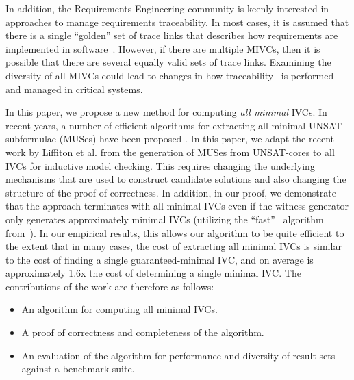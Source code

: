 \noindent In addition, the Requirements Engineering community is keenly interested in approaches to manage requirements traceability.  In most cases, it is assumed that there is a single ``golden'' set of trace links that describes how requirements are implemented in software~\cite{COEST,hayes2003improving,cleland2007best}. However, if there are multiple MIVCs, then it is possible that there are several equally valid sets of trace links.  Examining the diversity of all MIVCs could lead to changes in how traceability~\cite{COEST,hayes2003improving,cleland2007best} is performed and managed in critical systems.


In this paper, we propose a new method for computing \emph{all minimal} IVCs. In  recent  years,  a  number  of  efficient
algorithms  for  extracting  all minimal UNSAT subformulae (MUSes)  have  been proposed \cite{bacchus2015using, belov2012muser2, belov2013core, belov2012towards, nadel2014accelerated, liffiton2005max}.  In this paper, we adapt the recent work by Liffiton et al. \cite{marco2016fast} from the generation of MUSes from UNSAT-cores to all IVCs for inductive model checking.  This requires changing the underlying mechanisms that are used to construct candidate solutions and also changing the structure of the proof of correctness.  In addition, in our proof, we demonstrate that the approach terminates with all minimal IVCs even if the witness generator only generates approximately minimal IVCs (utilizing the ``fast'' \ucalg\ algorithm from~\cite{Ghass16}).  In our empirical results, this allows our algorithm to be quite efficient to the extent that in many cases, the cost of extracting all minimal IVCs is similar to the cost of finding a single guaranteed-minimal IVC, and on average is approximately 1.6x the cost of determining a single minimal IVC.
The contributions of the work are therefore as follows:
\begin{itemize}
    \item An algorithm for computing all minimal IVCs.
    \item A proof of correctness and completeness of the algorithm.
    \item An evaluation of the algorithm for performance and diversity of result sets against a benchmark suite.
\end{itemize}

